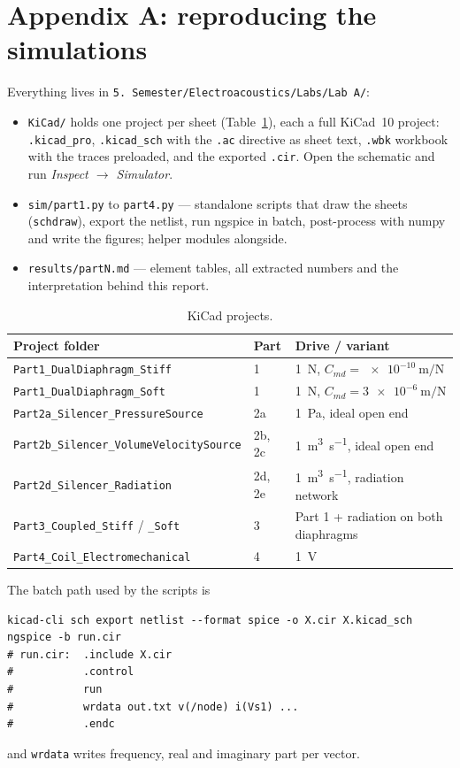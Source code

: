 \documentclass[a4paper,11pt]{article}
\begin{document}
\FloatBarrier
\section*{Appendix A: reproducing the simulations}
Everything lives in \texttt{5.~Semester/Electroacoustics/Labs/Lab A/}:
\begin{itemize}[nosep]
\item \texttt{KiCad/} holds one project per sheet (Table~\ref{tab:projects}), each a full KiCad~10 project:
      \texttt{.kicad\_pro}, \texttt{.kicad\_sch} with the \texttt{.ac} directive as sheet text, \texttt{.wbk} workbook
      with the traces preloaded, and the exported \texttt{.cir}. Open the schematic and run \emph{Inspect $\to$ Simulator}.
\item \texttt{sim/part1.py} to \texttt{part4.py} --- standalone scripts that draw the sheets (\texttt{schdraw}),
      export the netlist, run ngspice in batch, post-process with numpy and write the figures; helper modules alongside.
\item \texttt{results/partN.md} --- element tables, all extracted numbers and the interpretation behind this report.
\end{itemize}
\begin{table}[H]\centering\small
\begin{tabular}{@{}lll@{}}\toprule
Project folder & Part & Drive / variant \\ \midrule
\texttt{Part1\_DualDiaphragm\_Stiff} & 1 & \SI{1}{\newton}, $C_{md} = \SI{e-10}{\metre\per\newton}$ \\
\texttt{Part1\_DualDiaphragm\_Soft} & 1 & \SI{1}{\newton}, $C_{md} = \SI{3e-6}{\metre\per\newton}$ \\
\texttt{Part2a\_Silencer\_PressureSource} & 2a & \SI{1}{\pascal}, ideal open end \\
\texttt{Part2b\_Silencer\_VolumeVelocitySource} & 2b, 2c & \SI{1}{\cubic\metre\per\second}, ideal open end \\
\texttt{Part2d\_Silencer\_Radiation} & 2d, 2e & \SI{1}{\cubic\metre\per\second}, radiation network \\
\texttt{Part3\_Coupled\_Stiff} / \texttt{\_Soft} & 3 & Part 1 + radiation on both diaphragms \\
\texttt{Part4\_Coil\_Electromechanical} & 4 & \SI{1}{\volt} \\
\bottomrule\end{tabular}
\caption{KiCad projects.}\label{tab:projects}
\end{table}
The batch path used by the scripts is
\begin{verbatim}
kicad-cli sch export netlist --format spice -o X.cir X.kicad_sch
ngspice -b run.cir
# run.cir:  .include X.cir
#           .control
#           run
#           wrdata out.txt v(/node) i(Vs1) ...
#           .endc
\end{verbatim}
and \texttt{wrdata} writes frequency, real and imaginary part per vector.
\end{document}

